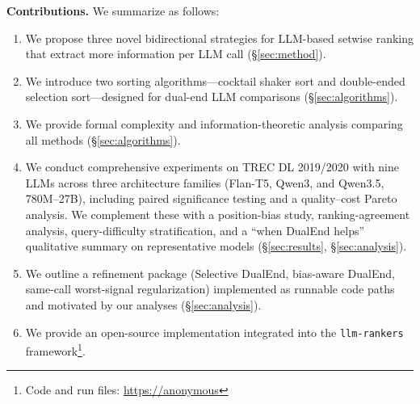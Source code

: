 \textbf{Contributions.} We summarize as follows:
\begin{enumerate}[leftmargin=*]
\item We propose three novel bidirectional strategies for LLM-based setwise ranking that extract more information per LLM call (\S\ref{sec:method}).
\item We introduce two sorting algorithms---cocktail shaker sort and double-ended selection sort---designed for dual-end LLM comparisons (\S\ref{sec:algorithms}).
\item We provide formal complexity and information-theoretic analysis comparing all methods (\S\ref{sec:algorithms}).
\item We conduct comprehensive experiments on TREC DL 2019/2020 with nine LLMs across three architecture families (Flan-T5, Qwen3, and Qwen3.5, 780M--27B), including paired significance testing and a quality--cost Pareto analysis. We complement these with a position-bias study, ranking-agreement analysis, query-difficulty stratification, and a ``when DualEnd helps'' qualitative summary on representative models (\S\ref{sec:results}, \S\ref{sec:analysis}).
\item We outline a refinement package (Selective DualEnd, bias-aware DualEnd, same-call worst-signal regularization) implemented as runnable code paths and motivated by our analyses (\S\ref{sec:analysis}).
\item We provide an open-source implementation integrated into the \texttt{llm-rankers} framework\footnote{Code and run files: \url{https://anonymous}}.
\end{enumerate}
